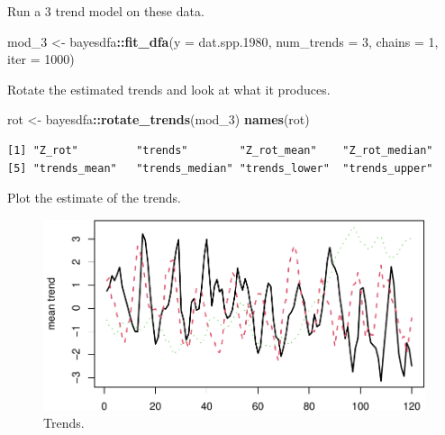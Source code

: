 \documentclass[
]{article}
\newenvironment{Shaded}{\begin{snugshade}}{\end{snugshade}}
\newcommand{\DataTypeTok}[1]{\textcolor[rgb]{0.13,0.29,0.53}{#1}}
\newcommand{\DecValTok}[1]{\textcolor[rgb]{0.00,0.00,0.81}{#1}}
\newcommand{\FloatTok}[1]{\textcolor[rgb]{0.00,0.00,0.81}{#1}}
\newcommand{\KeywordTok}[1]{\textcolor[rgb]{0.13,0.29,0.53}{\textbf{#1}}}
\newcommand{\NormalTok}[1]{#1}
\newcommand{\OperatorTok}[1]{\textcolor[rgb]{0.81,0.36,0.00}{\textbf{#1}}}
\newcommand{\StringTok}[1]{\textcolor[rgb]{0.31,0.60,0.02}{#1}}
\begin{document}
Run a 3 trend model on these data.

\begin{Shaded}
\begin{Highlighting}[]
\NormalTok{mod_}\DecValTok{3}\NormalTok{ <-}\StringTok{ }\NormalTok{bayesdfa}\OperatorTok{::}\KeywordTok{fit_dfa}\NormalTok{(}\DataTypeTok{y =}\NormalTok{ dat.spp}\FloatTok{.1980}\NormalTok{, }\DataTypeTok{num_trends =} \DecValTok{3}\NormalTok{, }
    \DataTypeTok{chains =} \DecValTok{1}\NormalTok{, }\DataTypeTok{iter =} \DecValTok{1000}\NormalTok{)}
\end{Highlighting}
\end{Shaded}

Rotate the estimated trends and look at what it produces.

\begin{Shaded}
\begin{Highlighting}[]
\NormalTok{rot <-}\StringTok{ }\NormalTok{bayesdfa}\OperatorTok{::}\KeywordTok{rotate_trends}\NormalTok{(mod_}\DecValTok{3}\NormalTok{)}
\KeywordTok{names}\NormalTok{(rot)}
\end{Highlighting}
\end{Shaded}

\begin{verbatim}
[1] "Z_rot"         "trends"        "Z_rot_mean"    "Z_rot_median" 
[5] "trends_mean"   "trends_median" "trends_lower"  "trends_upper" 
\end{verbatim}

Plot the estimate of the trends.

\begin{Shaded}
\end{Shaded}

\begin{figure}

{\centering \includegraphics[width=0.8\linewidth]{fitting-models-with-stan_files/figure-latex/stan-dfa-plot-trends-1} 

}

\caption{Trends.}\label{fig:stan-dfa-plot-trends}
\end{figure}
\end{document}
